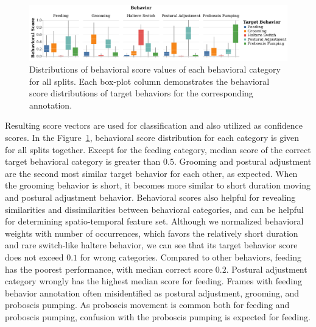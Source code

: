 \begin{figure}[ht!]
	\centering
	\includegraphics[width=\linewidth]{figures/BehavioralScoresDistributions_perBehavior.pdf}
	\caption[Distributions of behavioral score values of each behavioral category for all splits.]{Distributions of behavioral score values of each behavioral category for all splits.
		Each box-plot column demonstrates the behavioral score distributions of target behaviors for the corresponding annotation.\label{figure:behavioral-score-distributions}}
\end{figure}

Resulting score vectors are used for classification and also utilized as confidence scores.
In the Figure~\ref{figure:behavioral-score-distributions}, behavioral score distribution for each category is given for all splits together.
Except for the feeding category, median score of the correct target behavioral category is greater than $0.5$.
Grooming and postural adjustment are the second most similar target behavior for each other, as expected.
When the grooming behavior is short, it becomes more similar to short duration moving and postural adjustment behavior.
Behavioral scores also helpful for revealing similarities and dissimilarities between behavioral categories, and can be helpful for determining spatio-temporal feature set.
Although we normalized behavioral weights with number of occurrences, which favors the relatively short duration and rare switch-like haltere behavior, we can see that its target behavior score does not exceed $0.1$ for wrong categories.
Compared to other behaviors, feeding has the poorest performance, with median correct score $0.2$.
Postural adjustment category wrongly has the highest median score for feeding.
Frames with feeding behavior annotation often misidentified as postural adjustment, grooming, and proboscis pumping.
As proboscis movement is common both for feeding and proboscis pumping, confusion with the proboscis pumping is expected for feeding.

